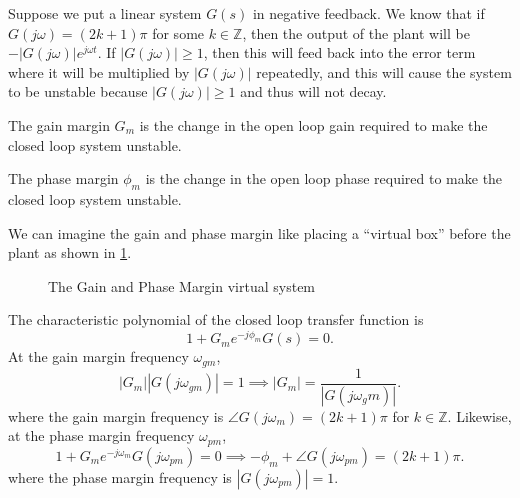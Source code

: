 Suppose we put a linear system $G(s)$ in negative feedback. We know that if $G(j\omega) = (2k+1)\pi$ for some $k\in\mathbb{Z}$, then the output of the plant will be $-|G(j\omega)|e^{j\omega t}$.
If $|G(j\omega)| \geq 1$, then this will feed back into the error term where it will be multiplied by $|G(j\omega)|$ repeatedly, and this will cause the system to be unstable because $|G(j\omega)|\geq1$ and thus will not decay.
\begin{definition}
  The gain margin $G_m$ is the change in the open loop gain required to make the closed loop system unstable.
  \label{defn:gain-margin}
\end{definition}
\begin{definition}
  The phase margin $\phi_m$ is the change in the open loop phase required to make the closed loop system unstable.
  \label{defn:phase-margin}
\end{definition}
We can imagine the gain and phase margin like placing a ``virtual box'' before the plant as shown in \cref{fig:margin-controller}.
\begin{figure}[H]
    \centering 
    \caption{The Gain and Phase Margin virtual system}
    \label{fig:margin-controller}
\end{figure}
The characteristic polynomial of the closed loop transfer function is
\[
  1 + G_me^{-j\phi_m}G(s) = 0.
\]
At the gain margin frequency $\omega_{gm}$,
\[
  |G_m||G(j\omega_{gm})| = 1 \implies |G_m| = \frac{1}{|G(j\omega_gm)|}.
\]
where the gain margin frequency is $\angle G(j\omega_m) = (2k+1)\pi$ for $k\in\mathbb{Z}$.
Likewise, at the phase margin frequency $\omega_{pm}$, 
\[
  1 + G_me^{-j\omega_m}G(j\omega_{pm}) = 0 \implies -\phi_m + \angle G(j\omega_{pm}) = (2k+1)\pi.
\]
where the phase margin frequency is $|G(j\omega_{pm})| = 1$.

